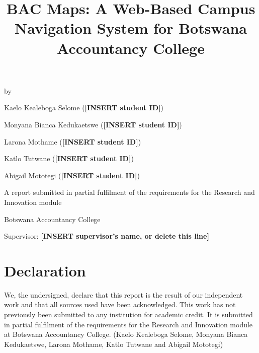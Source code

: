 \documentclass[12pt,a4paper]{report}
\title{BAC Maps: A Web-Based Campus Navigation System for Botswana Accountancy College}
\author{}
\date{\placeholder{submission date}}
\newcommand{\placeholder}[1]{\textbf{[INSERT #1]}}
\begin{document}

\begin{titlepage}
    \singlespacing   %
    \centering
    \vspace*{1cm}
    {\Huge\bfseries\thetitle\par}
    \vspace{1cm}

    {\Large by\par}
    \vspace{0.2cm}

    {\Large Kaelo Kealeboga Selome (\placeholder{student ID})\par}
    {\Large Monyana Bianca Kedukaetswe (\placeholder{student ID})\par}
    {\Large Larona Mothame (\placeholder{student ID})\par}
    {\Large Katlo Tutwane (\placeholder{student ID})\par}
    {\Large Abigail Mototegi (\placeholder{student ID})\par}

    \vfill

    {\large A report submitted in partial fulfilment of the requirements for the Research and Innovation module\par}
    \vspace{0.2cm}
    {\large Botswana Accountancy College\par}
    \vspace{0.2cm}
    {\large Supervisor: \placeholder{supervisor's name, or delete this line}\par}
    \vspace{0.5cm}
    {\large \thedate\par}
\end{titlepage}

\chapter*{Declaration}

We, the undersigned, declare that this report is the result of our independent work and that all sources used have been acknowledged. This work has not previously been submitted to any institution for academic credit. It is submitted in partial fulfilment of the requirements for the Research and Innovation module at Botswana Accountancy College. (Kaelo Kealeboga Selome, Monyana Bianca Kedukaetswe, Larona Mothame, Katlo Tutwane and Abigail Mototegi)
\end{document}
